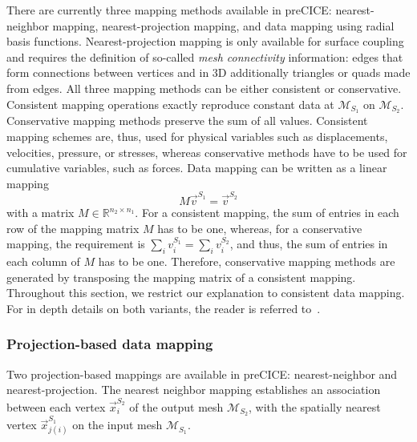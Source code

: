 There are currently three mapping methods available in preCICE: nearest-neighbor mapping, nearest-projection mapping, and data mapping using radial basis functions. Nearest-projection mapping is only available for surface coupling and requires the definition of so-called \textit{mesh connectivity} information: edges that form connections between vertices and in 3D additionally triangles or quads made from edges.
%
All three mapping methods can be either consistent or conservative. Consistent mapping operations exactly reproduce constant data at $\mathcal{M}_{S_1}$ on $\mathcal{M}_{S_2}$. Conservative mapping methods preserve the sum of all values. Consistent mapping schemes are, thus, used for physical variables such as displacements, velocities, pressure, or stresses, whereas conservative methods have to be used for cumulative variables, such as forces. 
%
Data mapping can be written as a linear mapping
%
\[ M \vec{v}^{S_1} = \vec{v}^{S_2} \]
with a matrix $M \in \mathbb{R}^{n_2 \times n_1}$. For a consistent mapping, the sum of entries in each row of the mapping matrix $M$ has to be one, whereas, for a conservative mapping, the requirement is $\sum_i v_i^ {S_1} = \sum_i v_i^{S_2}$, and thus, the sum of entries in each column of $M$ has to be one. Therefore, conservative mapping methods are generated by transposing the 
mapping matrix of a consistent mapping.  
Throughout this section, we restrict our explanation to consistent data mapping.  
For in depth details on both variants, the reader is referred to~\cite{DeBoer2008_ComparisonMapping, Gatzhammer2015, Lindner2019}.

\subsubsection{Projection-based data mapping}
\label{map:projectionMethods}

Two projection-based mappings are available in preCICE: nearest-neighbor and nearest-projection. 
The nearest neighbor mapping establishes an association between each vertex $\vec{x}_i^{S_2}$ of the output mesh $\mathcal{M}_{S_2}$, with the spatially nearest vertex $\vec{x}_{j(i)}^{S_1}$ on the input mesh $\mathcal{M}_{S_1}$.

